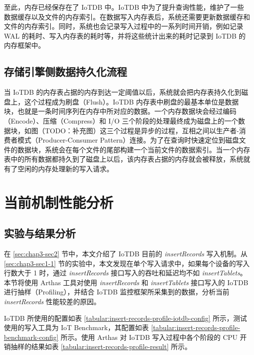 至此，内存已经保存在了 IoTDB 中。IoTDB 中为了提升查询性能，维护了一些数据缓存以及文件的内存索引。在数据写入内存表后，系统还需要更新数据缓存和文件的内存索引。同时，系统也会记录写入过程中的一系列时间开销，例如记录 WAL 的耗时、写入内存表的耗时等，并将这些统计出来的耗时记录到 IoTDB 的内存框架中。
\subsection{存储引擎侧数据持久化流程}
当 IoTDB 的内存表占据的内存到达一定阈值以后，系统就会把内存表持久化到磁盘上，这个过程成为刷盘（Flush）。IoTDB 内存表中刷盘的最基本单位是数据块，也就是一条时间序列在内存中所对应的数据。一个内存数据块会经过编码（Encode）、压缩（Compress）和 I/O 三个阶段的处理最终成为磁盘上的一个数据块，如图（TODO：补充图）这三个过程是异步的过程，互相之间以生产者-消费者模式（Producer-Consumer Pattern）连接。为了在查询时快速定位到磁盘文件的数据块，系统会在每个文件的尾部构建一个当前文件的数据索引。当一个内存表中的所有数据都持久到了磁盘上以后，该内存表占据的内存就会被释放，系统就有了空闲的内存处理新的写入请求。
\section{当前机制性能分析}
\subsection{实验与结果分析\label{sec:chap3-sec3-1}}
在 \ref{sec:chap3-sec2} 节中，本文介绍了 IoTDB 目前的 \emph{insertRecords} 写入机制。从 \ref{sec:chap3-sec1-1} 节的实验中，本文发现在单个写入请求中，如果每个设备的写入行数大于 1 时，通过 \emph{insertRecords} 接口写入的吞吐和延迟均不如 \emph{insertTablets}。本节将使用 Arthas 工具对使用 \emph{insertRecords} 和 \emph{insertTablets} 接口写入的 IoTDB 进行抽样（Profiling），并结合 IoTDB 监控框架所采集到的数据，分析当前 \emph{insertRecords} 性能较差的原因。


IoTDB 所使用的配置如表 \ref{tabular:insert-records-profile-iotdb-config} 所示，测试使用的写入工具为 IoT Benchmark\cite{liu2019benchmarking}，其配置如表 \ref{tabular:insert-records-profile-benchmark-config} 所示。使用 Arthas 对 IoTDB 写入过程中各个阶段的 CPU 开销抽样的结果如表 \ref{tabular:insert-records-profile-result} 所示。

